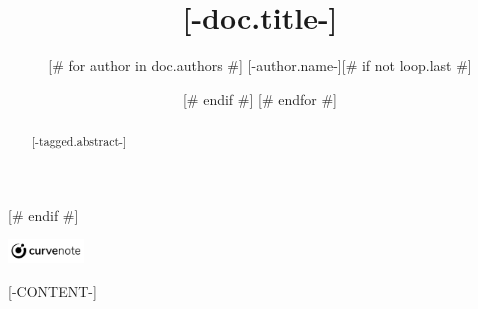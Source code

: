 \documentclass{article}
\title{[-doc.title-]}
\author{
[# for author in doc.authors #]
[-author.name-][# if not loop.last #] \and [# endif #]
[# endfor #]
}
\date{\displaydate{articleDate}}
\newcommand{\logo}{
  \href{[-doc.oxalink-]}{\includegraphics[width=2cm]{curvenote.png}}
}
\begin{document}
\begin{abstract}[-tagged.abstract-]\end{abstract}[# endif #]
\begin{center}\logo\end{center}
[-CONTENT-]

\end{document}

